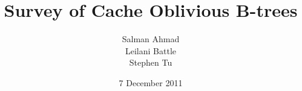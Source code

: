 \documentclass{style}
\begin{document}
\title{Survey of Cache Oblivious B-trees}
%
%
%
%
%

%
\author{
%
%
\alignauthor
Salman Ahmad\\
\alignauthor
Leilani Battle\\
\alignauthor
Stephen Tu\\
}
\date{7 December 2011}
\end{document}
